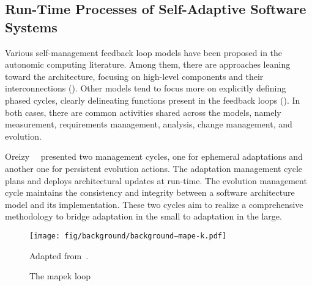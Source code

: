 \subsection{Run-Time Processes of Self-Adaptive Software Systems}
\label{subsect:background--run-time-processes}



Various self-management feedback loop models have been proposed in the autonomic computing literature. Among them, there are approaches leaning toward the architecture, focusing on high-level components and their interconnections (). Other models tend to focus more on explicitly defining phased cycles, clearly delineating functions present in the feedback loops (). In both cases, there are common activities shared across the models, namely measurement, requirements management, analysis, change management, and evolution.

Oreizy~\etal{}~\cite{oreizy-1999-architecture} presented two management cycles, one for ephemeral adaptations and another one for persistent evolution actions. The adaptation management cycle plans and deploys architectural updates at run-time. The evolution management cycle maintains the consistency and integrity between a software architecture model and its implementation. These two cycles aim to realize a comprehensive methodology to bridge adaptation in the small to adaptation in the large.

\begin{figure}[h]
	\centering
	\texttt{[image: fig/background/background--mape-k.pdf]}
	\caption{The \acrshort{mapek} loop}
	\label{fig:background--mape-k}
	Adapted from~\cite{kephart-2003-vision}.
\end{figure}

